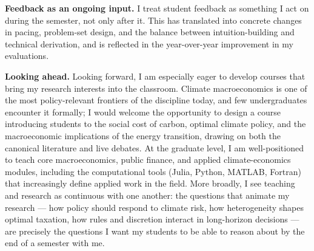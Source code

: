 \documentclass[11pt]{article}
\begin{document}
\textbf{Feedback as an ongoing input.}
I treat student feedback as something I act on during the semester, not only after it. %
This has translated into concrete changes in pacing, problem-set design, and the balance between intuition-building and technical derivation, and is reflected in the year-over-year improvement in my evaluations.


\textbf{Looking ahead.}
Looking forward, I am especially eager to develop courses that bring my research interests into the classroom. Climate macroeconomics is one of the most policy-relevant frontiers of the discipline today, and few undergraduates encounter it formally; I would welcome the opportunity to design a course introducing students to the social cost of carbon, optimal climate policy, and the macroeconomic implications of the energy transition, drawing on both the canonical literature and live debates. At the graduate level, I am well-positioned to teach core macroeconomics, public finance, and applied climate-economics modules, including the computational tools (Julia, Python, MATLAB, Fortran) that increasingly define applied work in the field. %
More broadly, I see teaching and research as continuous with one another: the questions that animate my research --- how policy should respond to climate risk, how heterogeneity shapes optimal taxation, how rules and discretion interact in long-horizon decisions --- are precisely the questions I want my students to be able to reason about by the end of a semester with me.
\end{document}
